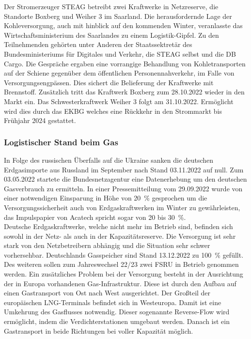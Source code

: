 	Der Stromerzeuger STEAG betreibt zwei Kraftwerke in Netzreserve, die Standorte Boxberg und Weiher 3 im Saarland. Die herausfordernde Lage der Kohleversorgung, auch mit hinblick auf den kommenden Winter, veranlasste das Wirtschaftsministerium des Saarlandes zu einem Logistik-Gipfel. Zu den Teilnehmenden gehörten unter Anderen der Staatssektretär des Bundesministeriums für Digitales und Verkehr, die STEAG selbst und die DB Cargo. Die Gespräche ergaben eine vorrangige Behandlung von Kohletransporten auf der Schiene gegenüber dem öffentlichen Personennahverkehr, im Falle von Versorgungsengpässen.\cite{Logistikgipfel_Saarland} Dies sichert die Belieferung der Kraftwerke mit Brennstoff. Zusätzlich tritt das Kraftwerk Boxberg zum 28.10.2022 wieder in den Markt ein. Das Schwesterkraftwerk Weiher 3 folgt am 31.10.2022. Ermöglicht wird dies durch das EKBG welches eine Rückkehr in den Strommarkt bis Frühjahr 2024 gestattet.\cite{STEAG_Steinkohle} \\
	
	
	\subsubsection{Logistischer Stand beim Gas}
	In Folge des russischen Überfalls auf die Ukraine sanken die deutschen Erdgasimporte aus Russland im September nach Stand 03.11.2022 auf null. Zum 03.05.2022 startete die Bundesnetzagentur eine Datenerhebung um den deutschen Gasverbrauch zu ermitteln.\cite{Datenerhebung_Gas} In einer Pressemitteilung vom 29.09.2022 wurde von einer notwendigen Einsparung in Höhe von \SI{20}{\percent} gesprochen um die Versorgungssicherheit auch von Erdgaskraftwerken im Winter zu gewährleisten, das Impulspapier von Acatech spricht sogar von 20 bis \SI{30}{\percent}.\cite{Impuls_Acatech_Einsparung}\\
	
	Deutsche Erdgaskraftwerke, welche nicht mehr im Betrieb sind, befinden sich sowohl in der Netz- als auch in der Kapazitätsreserve. Die Versorgung ist sehr stark von den Netzbetreibern abhängig und die Situation sehr schwer vorhersehbar. Deutschlands Gasspeicher sind Stand 13.12.2022 zu \SI{100}{\percent} gefüllt. Des weiteren sollen zum Jahreswechsel 22/23 zwei FSRU in Betrieb genommen werden.\cite{LNG_FSRU}
	Ein zusätzliches Problem bei der Versorgung besteht in der Ausrichtung der in Europa vorhandenen Gas-Infrastruktur. Diese ist durch den Aufbau auf einen Gastransport von Ost nach West ausgerichtet. Der Großteil der europäischen LNG-Terminals befindet sich in Westeuropa. Damit ist eine Umkehrung des Gasflusses notwendig. Dieser sogenannte Reverse-Flow wird ermöglicht, indem die Verdichterstationen umgebaut werden. Danach ist ein Gastransport in beide Richtungen bei voller Kapazität möglich.\cite{Impuls_Acatech_Reverse_Flow} \\
	
